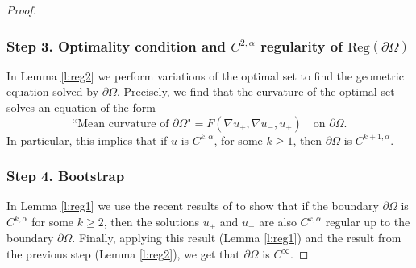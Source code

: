 \documentclass[JEP,XML,SOM,Unicode]{cedram}
\newcommand{\Reg}{\mathrm{Reg}}
\theoremstyle{plain}
\theoremstyle{definition}
\begin{document}
\begin{proof}
\subsubsection*{Step 3. Optimality condition and $C^{2,\alpha}$ regularity of $ \Reg(\partial\Omega)$} In Lemma \ref{l:reg2} we perform variations of the optimal set to find the geometric equation solved by $\partial\Omega$. Precisely, we find that the curvature of the optimal set solves an equation of the form
\[\text{``Mean curvature of $\partial\Omega$"}=F(\nabla u_+,\nabla u_-,u_\pm)\quad\text{on } \partial\Omega.\]
In particular, this implies that if $u$ is $C^{k,\alpha}$, for some $k\ge 1$, then $\partial\Omega$ is $C^{k+1,\alpha}$.

\subsubsection*{Step 4. Bootstrap} In Lemma \ref{l:reg1} we use the recent results of \cite{D} to show that if the boundary $\partial\Omega$ is $C^{k,\alpha}$ for some $k\ge 2$, then the solutions $u_+$ and $u_-$ are also $C^{k,\alpha}$ regular up to the boundary $\partial\Omega$. Finally, applying this result (Lemma \ref{l:reg1}) and the result from the previous step (Lemma \ref{l:reg2}), we get that $\partial\Omega$ is $C^\infty$.
\end{proof}
\end{document}
